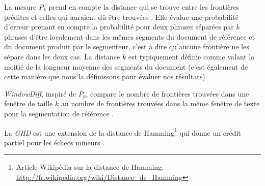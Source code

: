 La mesure ${P_{k}}$ prend en compte la distance qui se trouve entre les frontières prédites et celles qui auraient dû être trouvées \cite{beeferman1999statistical}. Elle évalue une probabilité d’erreur prenant en compte la probabilité pour deux phrases séparées par $k$ phrases d’être localement dans les mêmes segments du document de référence et du document produit par le segmenteur, c’est à dire qu’aucune frontière ne les sépare dans les deux cas. La distance $k$ est typiquement définie comme valant la moitié de la longueur moyenne des segments du document (c'est également de cette manière que nous la définissons pour évaluer nos résultats).

\textit{WindowDiff}, inspiré de ${P_{k}}$, compare le nombre de frontières trouvées dans une fenêtre de taille $k$ au nombre de frontières trouvées dans la même fenêtre de texte pour la segmentation de référence \cite{pevzner2002critique}.

La \textit{GHD} est une extension de la distance de Hamming\footnote{Article Wikipédia sur la distance de Hamming: \url{http://fr.wikipedia.org/wiki/Distance_de_Hamming}} qui donne un crédit partiel pour les échecs mineurs \cite{bookstein2002generalized}.